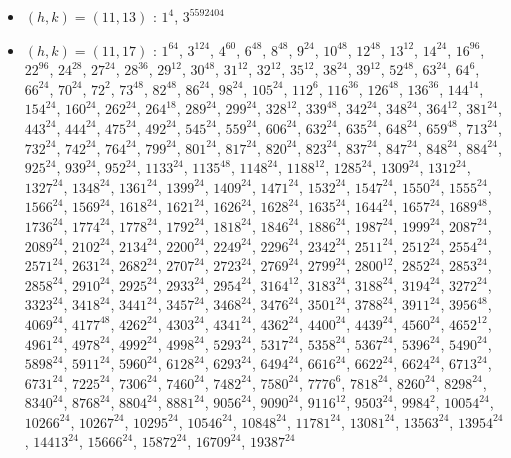 \begin{itemize}
\item $(h,k)=(11,13)$ : $1^{4}$, $3^{5592404}$
\item $(h,k)=(11,17)$ : $1^{64}$, $3^{124}$, $4^{60}$, $6^{48}$, $8^{48}$, $9^{24}$, $10^{48}$, $12^{48}$, $13^{12}$, $14^{24}$, $16^{96}$, $22^{96}$, $24^{28}$, $27^{24}$, $28^{36}$, $29^{12}$, $30^{48}$, $31^{12}$, $32^{12}$, $35^{12}$, $38^{24}$, $39^{12}$, $52^{48}$, $63^{24}$, $64^{6}$, $66^{24}$, $70^{24}$, $72^{2}$, $73^{48}$, $82^{48}$, $86^{24}$, $98^{24}$, $105^{24}$, $112^{6}$, $116^{36}$, $126^{48}$, $136^{36}$, $144^{14}$, $154^{24}$, $160^{24}$, $262^{24}$, $264^{18}$, $289^{24}$, $299^{24}$, $328^{12}$, $339^{48}$, $342^{24}$, $348^{24}$, $364^{12}$, $381^{24}$, $443^{24}$, $444^{24}$, $475^{24}$, $492^{24}$, $545^{24}$, $559^{24}$, $606^{24}$, $632^{24}$, $635^{24}$, $648^{24}$, $659^{48}$, $713^{24}$, $732^{24}$, $742^{24}$, $764^{24}$, $799^{24}$, $801^{24}$, $817^{24}$, $820^{24}$, $823^{24}$, $837^{24}$, $847^{24}$, $848^{24}$, $884^{24}$, $925^{24}$, $939^{24}$, $952^{24}$, $1133^{24}$, $1135^{48}$, $1148^{24}$, $1188^{12}$, $1285^{24}$, $1309^{24}$, $1312^{24}$, $1327^{24}$, $1348^{24}$, $1361^{24}$, $1399^{24}$, $1409^{24}$, $1471^{24}$, $1532^{24}$, $1547^{24}$, $1550^{24}$, $1555^{24}$, $1566^{24}$, $1569^{24}$, $1618^{24}$, $1621^{24}$, $1626^{24}$, $1628^{24}$, $1635^{24}$, $1644^{24}$, $1657^{24}$, $1689^{48}$, $1736^{24}$, $1774^{24}$, $1778^{24}$, $1792^{24}$, $1818^{24}$, $1846^{24}$, $1886^{24}$, $1987^{24}$, $1999^{24}$, $2087^{24}$, $2089^{24}$, $2102^{24}$, $2134^{24}$, $2200^{24}$, $2249^{24}$, $2296^{24}$, $2342^{24}$, $2511^{24}$, $2512^{24}$, $2554^{24}$, $2571^{24}$, $2631^{24}$, $2682^{24}$, $2707^{24}$, $2723^{24}$, $2769^{24}$, $2799^{24}$, $2800^{12}$, $2852^{24}$, $2853^{24}$, $2858^{24}$, $2910^{24}$, $2925^{24}$, $2933^{24}$, $2954^{24}$, $3164^{12}$, $3183^{24}$, $3188^{24}$, $3194^{24}$, $3272^{24}$, $3323^{24}$, $3418^{24}$, $3441^{24}$, $3457^{24}$, $3468^{24}$, $3476^{24}$, $3501^{24}$, $3788^{24}$, $3911^{24}$, $3956^{48}$, $4069^{24}$, $4177^{48}$, $4262^{24}$, $4303^{24}$, $4341^{24}$, $4362^{24}$, $4400^{24}$, $4439^{24}$, $4560^{24}$, $4652^{12}$, $4961^{24}$, $4978^{24}$, $4992^{24}$, $4998^{24}$, $5293^{24}$, $5317^{24}$, $5358^{24}$, $5367^{24}$, $5396^{24}$, $5490^{24}$, $5898^{24}$, $5911^{24}$, $5960^{24}$, $6128^{24}$, $6293^{24}$, $6494^{24}$, $6616^{24}$, $6622^{24}$, $6624^{24}$, $6713^{24}$, $6731^{24}$, $7225^{24}$, $7306^{24}$, $7460^{24}$, $7482^{24}$, $7580^{24}$, $7776^{6}$, $7818^{24}$, $8260^{24}$, $8298^{24}$, $8340^{24}$, $8768^{24}$, $8804^{24}$, $8881^{24}$, $9056^{24}$, $9090^{24}$, $9116^{12}$, $9503^{24}$, $9984^{2}$, $10054^{24}$, $10266^{24}$, $10267^{24}$, $10295^{24}$, $10546^{24}$, $10848^{24}$, $11781^{24}$, $13081^{24}$, $13563^{24}$, $13954^{24}$, $14413^{24}$, $15666^{24}$, $15872^{24}$, $16709^{24}$, $19387^{24}$

\end{itemize}
